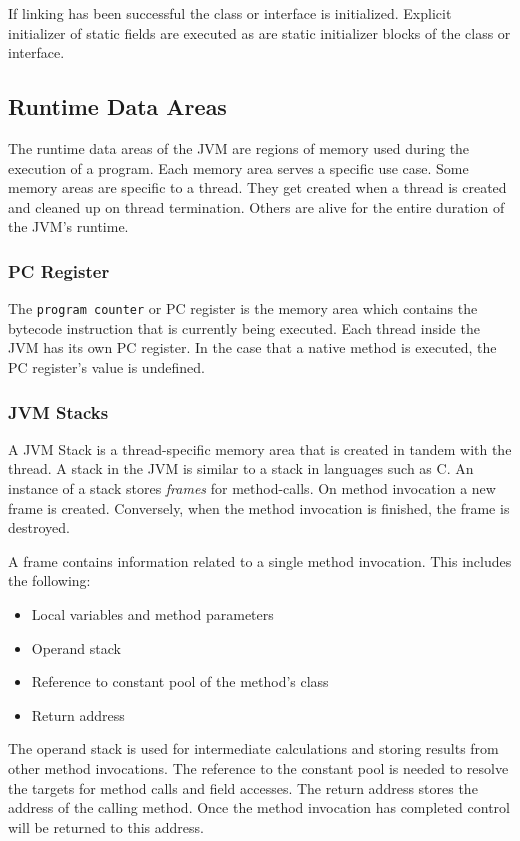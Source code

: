 If linking has been successful the class or interface is initialized. Explicit initializer of static fields are executed as are static initializer blocks of the class or interface.

\subsection{Runtime Data Areas}

The runtime data areas of the JVM are regions of memory used during the execution of a program. Each memory area serves a specific use case. Some memory areas are specific to a thread. They get created when a thread is created and cleaned up on thread termination. Others are alive for the entire duration of the JVM's runtime.  

\subsubsection{PC Register}

The \texttt{program counter} or PC register is the memory area which contains the bytecode instruction that is currently being executed. Each thread inside the JVM has its own PC register. In the case that a native method is executed, the PC register's value is undefined.

\subsubsection{JVM Stacks}

A JVM Stack is a thread-specific memory area that is created in tandem with the thread. A stack in the JVM is similar to a stack in languages such as C. An instance of a stack stores \textit{frames} for method-calls. On method invocation a new frame is created. Conversely, when the method invocation is finished, the frame is destroyed. 

A frame contains information related to a single method invocation. This includes the following:

\begin{itemize}
    \item Local variables and method parameters
    \item Operand stack
    \item Reference to constant pool of the method's class
    \item Return address 
\end{itemize}

The operand stack is used for intermediate calculations and storing results from other method invocations. The reference to the constant pool is needed to resolve the targets for method calls and field accesses. The return address stores the address of the calling method. Once the method invocation has completed control will be returned to this address.

